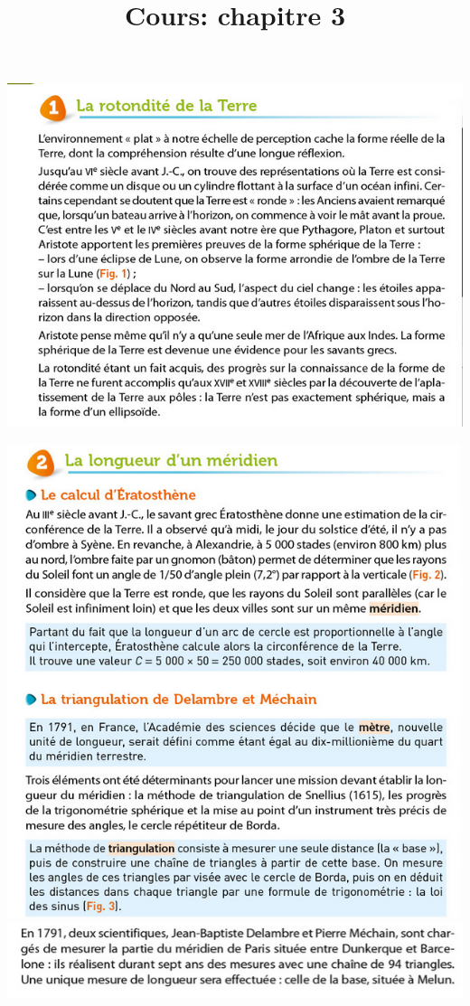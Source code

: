 \documentclass[10pt]{article}
\newcommand{\titreActivite}{Cours: chapitre 3} %
\newcommand{\myscale}{0.55}
\begin{document}
\date{}
\title{\titreActivite}
\maketitle %


\begin{center}

	\begin{minipage}[c]{0.6\textwidth}
		\centering
		\includegraphics[scale=\myscale]{assets/1.png}

		\includegraphics[scale=\myscale]{assets/2a.png}
		\includegraphics[scale=\myscale]{assets/2b.png}


\end{minipage}
\end{center}
\end{document}
